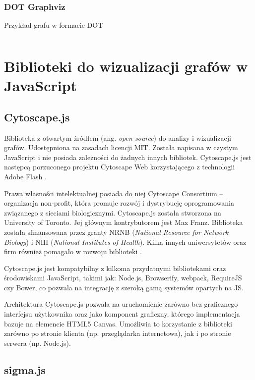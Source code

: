 \subsubsection{DOT Graphviz} 
\begin{listing}[H]
    \caption{Przykład grafu w formacie DOT}
    \inputminted{text}{example.gv}
    \label{lst:dot-example}
\end{listing}

\section{Biblioteki do wizualizacji grafów w JavaScript}

\subsection{Cytoscape.js}

Biblioteka z otwartym źródłem (ang. \textit{open-source}) do analizy i wizualizacji grafów. Udostępniona na zasadach licencji MIT. Została napisana w czystym JavaScript i nie posiada zależności do żadnych innych bibliotek. Cytoscape.js jest następcą porzuconego projektu Cytoscape Web korzystającego z technologii Adobe Flash \cite[309]{franz}. 

Prawa własności intelektualnej posiada do niej Cytoscape Consortium -- organizacja non-profit, która promuje rozwój i dystrybucję oprogramowania związanego z sieciami biologicznymi. Cytoscape.js została stworzona na University of Toronto. Jej głównym kontrybutorem jest Max Franz. Biblioteka została sfinansowana przez granty NRNB (\textit{National Resource for Network Biology}) i NIH (\textit{National Institutes of Health}). Kilka innych uniwersytetów oraz firm również pomagało w rozwoju biblioteki \cite{cytoscape}. 

Cytoscape.js jest kompatybilny z kilkoma przydatnymi bibliotekami oraz środowiskami JavaScript, takimi jak: Node.js, Browserify, webpack, RequireJS czy Bower, co pozwala na integrację z szeroką gamą systemów opartych na JS. 

Architektura Cytoscape.js pozwala na uruchomienie zarówno bez graficznego interfejsu użytkownika oraz jako komponent graficzny, którego implementacja bazuje na elemencie HTML5 Canvas. Umożliwia to korzystanie z biblioteki zarówno po stronie klienta (np. przeglądarka internetowa), jak i po stronie serwera (np. Node.js).


\subsection{sigma.js}
